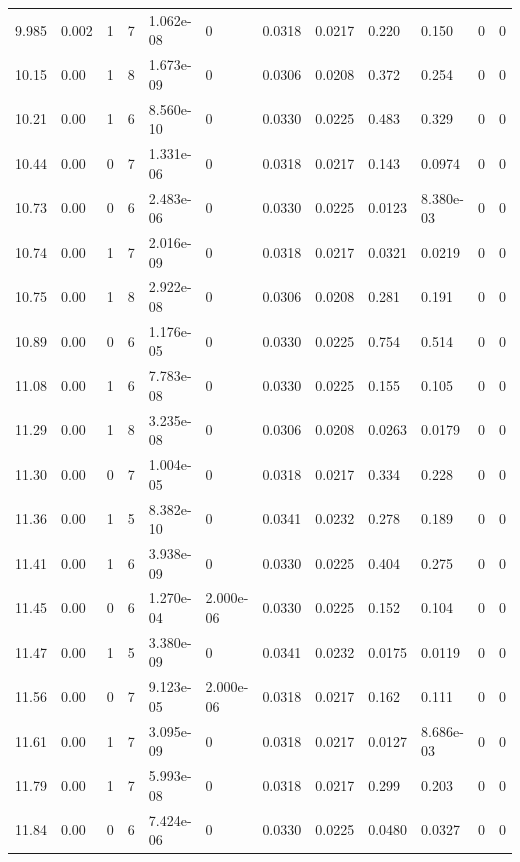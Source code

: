 \documentclass[preview]{standalone}
\begin{document}
{{{{\begin{tabular}{L{1.2cm}C{1.2cm} C{0.3cm}C{0.5cm} C{1.4cm}C{1.4cm} C{1.4cm}C{1.4cm} C{1.6cm}C{1.6cm} C{1.6cm}C{1.6cm}}
  9.985  &  0.002  & 1     &  7 &  1.062e-08  & 0  &  0.0318&   0.0217& 0.220 & 0.150   &  0 & 0  \\ 
  10.15  &  0.00  & 1     &  8 &  1.673e-09  & 0  &  0.0306&   0.0208& 0.372 & 0.254   &  0 & 0  \\ 
  10.21  &  0.00  & 1     &  6 &  8.560e-10  & 0  &  0.0330&   0.0225& 0.483 & 0.329   &  0 & 0  \\ 
  10.44  &  0.00  & 0     &  7 &  1.331e-06  & 0  &  0.0318&   0.0217& 0.143 & 0.0974   &  0 & 0  \\ 
  10.73  &  0.00  & 0     &  6 &  2.483e-06  & 0  &  0.0330&   0.0225& 0.0123 & 8.380e-03   &  0 & 0  \\ 
  10.74  &  0.00  & 1     &  7 &  2.016e-09  & 0  &  0.0318&   0.0217& 0.0321 & 0.0219   &  0 & 0  \\ 
  10.75  &  0.00  & 1     &  8 &  2.922e-08  & 0  &  0.0306&   0.0208& 0.281 & 0.191   &  0 & 0  \\ 
  10.89  &  0.00  & 0     &  6 &  1.176e-05  & 0  &  0.0330&   0.0225& 0.754 & 0.514   &  0 & 0  \\ 
  11.08  &  0.00  & 1     &  6 &  7.783e-08  & 0  &  0.0330&   0.0225& 0.155 & 0.105   &  0 & 0  \\ 
  11.29  &  0.00  & 1     &  8 &  3.235e-08  & 0  &  0.0306&   0.0208& 0.0263 & 0.0179   &  0 & 0  \\ 
  11.30  &  0.00  & 0     &  7 &  1.004e-05  & 0  &  0.0318&   0.0217& 0.334 & 0.228   &  0 & 0  \\ 
  11.36  &  0.00  & 1     &  5 &  8.382e-10  & 0  &  0.0341&   0.0232& 0.278 & 0.189   &  0 & 0  \\ 
  11.41  &  0.00  & 1     &  6 &  3.938e-09  & 0  &  0.0330&   0.0225& 0.404 & 0.275   &  0 & 0  \\ 
  11.45  &  0.00  & 0     &  6 &  1.270e-04  & 2.000e-06  &  0.0330&   0.0225& 0.152 & 0.104   &  0 & 0  \\ 
  11.47  &  0.00  & 1     &  5 &  3.380e-09  & 0  &  0.0341&   0.0232& 0.0175 & 0.0119   &  0 & 0  \\ 
  11.56  &  0.00  & 0     &  7 &  9.123e-05  & 2.000e-06  &  0.0318&   0.0217& 0.162 & 0.111   &  0 & 0  \\ 
  11.61  &  0.00  & 1     &  7 &  3.095e-09  & 0  &  0.0318&   0.0217& 0.0127 & 8.686e-03   &  0 & 0  \\ 
  11.79  &  0.00  & 1     &  7 &  5.993e-08  & 0  &  0.0318&   0.0217& 0.299 & 0.203   &  0 & 0  \\ 
  11.84  &  0.00  & 0     &  6 &  7.424e-06  & 0  &  0.0330&   0.0225& 0.0480 & 0.0327   &  0 & 0  \\ 

\end{tabular}}}}}
\end{document}

